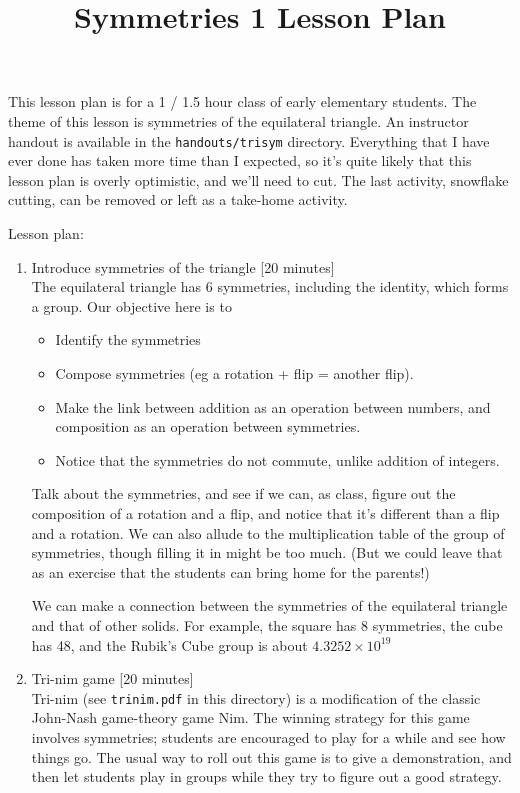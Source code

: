 \documentclass[12pt]{article}
\title{Symmetries 1 Lesson Plan}
\begin{document}
\thispagestyle{empty}

\maketitle

This lesson plan is for a 1 / 1.5 hour class of early elementary
students.  The theme of this lesson is symmetries of the equilateral
triangle.  An instructor handout is available in the
\texttt{handouts/trisym} directory.  Everything that I have ever done
has taken more time than I expected, so it's quite likely that this
lesson plan is overly optimistic, and we'll need to cut.  The last
activity, snowflake cutting, can be removed or left as a take-home
activity.

Lesson plan:
\begin{enumerate}
\item{Introduce symmetries of the triangle [20 minutes]}\\ The
  equilateral triangle has 6 symmetries, including the identity, which
  forms a group.  Our objective here is to
  \begin{itemize}
  \item Identify the symmetries
  \item Compose symmetries (eg a rotation + flip = another flip).
  \item Make the link between addition as an operation between
    numbers, and composition as an operation between symmetries.
  \item Notice that the symmetries do not commute, unlike addition of
    integers.
  \end{itemize}
  Talk about the symmetries, and see if we can, as class, figure out
  the composition of a rotation and a flip, and notice that it's
  different than a flip and a rotation.  We can also allude to the
  multiplication table of the group of symmetries, though filling it
  in might be too much. (But we could leave that as an exercise that
  the students can bring home for the parents!)
  
  We can make a connection between the symmetries of the equilateral
  triangle and that of other solids.  For example, the square has 8
  symmetries, the cube has 48, and the Rubik's Cube group is about
  $4.3252 \times 10^{19}$
\item{Tri-nim game [20 minutes]}\\ Tri-nim (see \texttt{trinim.pdf} in
  this directory) is a modification of the classic John-Nash
  game-theory game Nim.  The winning strategy for this game involves
  symmetries; students are encouraged to play for a while and see how
  things go.  The usual way to roll out this game is to give a
  demonstration, and then let students play in groups while they try
  to figure out a good strategy.


\end{enumerate}
\end{document}
